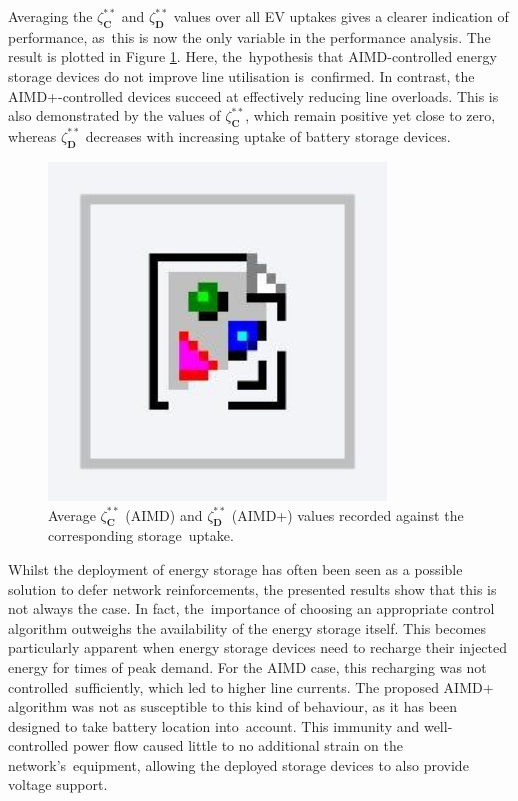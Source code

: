 Averaging the $\zeta_\textbf{C}^{**}$ and $\zeta_\textbf{D}^{**}$ values over all EV uptakes gives a clearer indication of performance, as~this is now the only variable in the performance analysis. The result is plotted in Figure \ref{fig-utilisation-AIMD-compare}. Here, the~hypothesis that AIMD-controlled energy storage devices do not improve line utilisation is~confirmed. In contrast, the AIMD+-controlled devices succeed at effectively reducing line overloads. This is also demonstrated by the values of $\zeta_\textbf{C}^{**}$, which remain positive yet close to zero, whereas $\zeta_\textbf{D}^{**}$ decreases with increasing uptake of battery storage devices.

\begin{figure}\centering
 \includegraphics[width=0.8\textwidth]{foo}
 \caption{Average $\zeta_\textbf{C}^{**}$ (AIMD) and $\zeta_\textbf{D}^{**}$ (AIMD+) values recorded against the corresponding storage~uptake.}
 \label{fig-utilisation-AIMD-compare}
\end{figure}

Whilst the deployment of energy storage has often been seen as a possible solution to defer network reinforcements, the presented results show that this is not always the case. In fact, the~importance of choosing an appropriate control algorithm outweighs the availability of the energy storage itself. This becomes particularly apparent when energy storage devices need to recharge their injected energy for times of peak demand. For the AIMD case, this recharging was not controlled~sufficiently, which led to higher line currents. The proposed AIMD+ algorithm was not as susceptible to this kind of behaviour, as it has been designed to take battery location into~account. This immunity and well-controlled power flow caused little to no additional strain on the network's~equipment, allowing the deployed storage devices to also provide voltage support.



